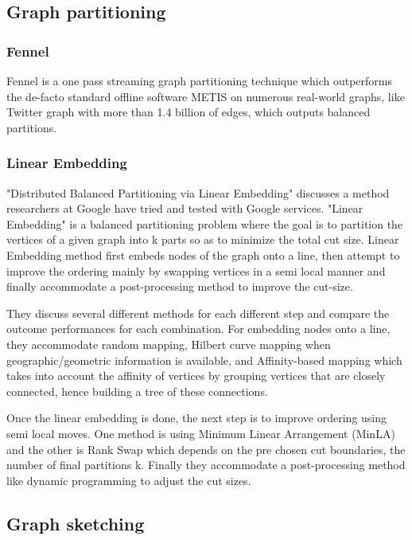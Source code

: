 \documentclass[12pt]{article}
\begin{document}
\subsection{Graph partitioning}
\subsubsection{Fennel}

Fennel \cite{Fennel} is a one pass streaming graph partitioning technique which outperforms the de-facto standard offline software METIS on numerous real-world graphs, like Twitter graph with more than 1.4 billion of edges, which outputs balanced partitions.

\subsubsection{Linear Embedding}

"Distributed Balanced Partitioning via Linear Embedding"\cite{Linear Embedding} discusses a method researchers at Google have tried and tested with Google services. "Linear Embedding" is a balanced partitioning problem where the goal is to partition the vertices of a given graph into k parts so as to minimize the total cut size. Linear Embedding method first embeds nodes of the graph onto a line, then attempt to improve the ordering mainly by swapping vertices in a semi local manner and finally accommodate a post-processing method to improve the cut-size.

They discuss several different methods for each different step and compare the outcome performances for each combination. For embedding nodes onto a line,  they accommodate random mapping, Hilbert curve mapping when geographic/geometric information is available, and Affinity-based mapping which takes into account the affinity of vertices by grouping vertices that are closely connected, hence building a tree of these connections.

Once the linear embedding is done, the next step is to  improve ordering using semi local moves. One method is using Minimum Linear Arrangement (MinLA)\cite{MinLA} and the other is Rank Swap which depends on the pre chosen cut boundaries, the number of final partitions k. Finally they accommodate a post-processing method like dynamic programming to adjust the cut sizes.

\subsection{Graph sketching}
\end{document}
